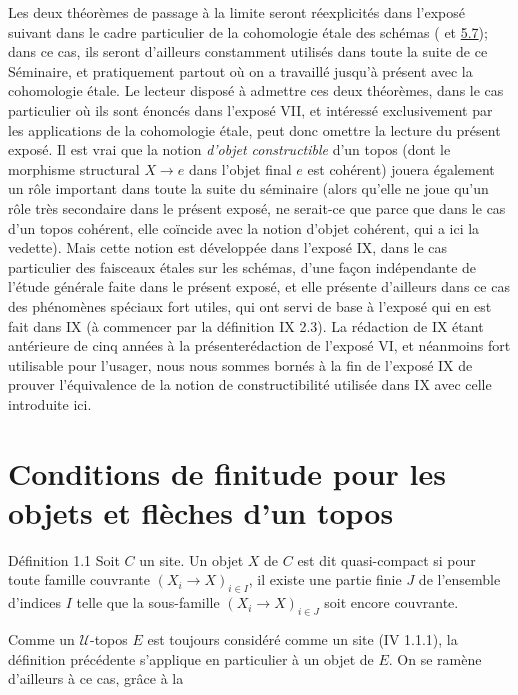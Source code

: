 \documentclass[10pt]{../fichiers-configuration-latex/smfart}
\begin{document}
Les deux théorèmes de passage à la limite seront réexplicités dans
l'exposé suivant dans le cadre particulier de la cohomologie étale des
schémas ( et \hyperref[VI.prop5.7]{5.7}); dans ce cas, ils seront d'ailleurs
constamment utilisés dans toute la suite de ce Séminaire, et
pratiquement partout où on a travaillé jusqu'à présent avec la
cohomologie étale. Le lecteur disposé à admettre ces deux théorèmes,
dans le cas particulier où ils sont énoncés dans l'exposé VII, et
intéressé exclusivement par les applications de la cohomologie étale,
peut donc omettre la lecture du présent exposé. Il est vrai que la
notion \emph{d'objet constructible} d'un topos (\ie dont le morphisme
structural $X \to e$ dans l'objet final $e$ est cohérent) jouera
également un rôle important dans toute la suite du séminaire (alors
qu'elle ne joue qu'un rôle très secondaire dans le présent exposé, ne
serait-ce que parce que dans le cas d'un topos cohérent, elle coïncide
avec la notion d'objet cohérent, qui a ici la vedette). Mais cette
notion est développée dans l'exposé IX, dans le cas particulier des
faisceaux étales sur les schémas, d'une façon indépendante de
l'étude générale faite dans le présent exposé, et elle présente
d'ailleurs dans ce cas des phénomènes spéciaux fort utiles, qui ont servi
de base à l'exposé qui en est fait dans IX (à commencer par la
définition IX 2.3). La rédaction de IX étant antérieure de cinq années
à la présente\pageoriginale rédaction de l'exposé VI, et néanmoins
fort utilisable pour l'usager, nous nous sommes bornés à la fin de l'exposé IX de
prouver l'équivalence de la notion de constructibilité utilisée dans
IX avec celle introduite ici.

\section{Conditions de finitude pour les objets et flèches d'un
  topos}

\begin{enonce*}{Définition 1.1}
Soit $C$ un site. Un objet $X$ de $C$ est dit quasi-compact si pour
toute famille couvrante $(X_i \to X)_{i\in I}$, il existe une partie
finie $J$ de l'ensemble d'indices $I$ telle que la sous-famille $(X_i
\to X)_{i \in J}$ soit encore couvrante.
\end{enonce*}

Comme un $𝒰$-topos $E$ est toujours considéré comme un site
(IV 1.1.1), la définition précédente s'applique en particulier à un
objet de $E$. On se ramène d'ailleurs à ce cas, grâce à la
\end{document}
